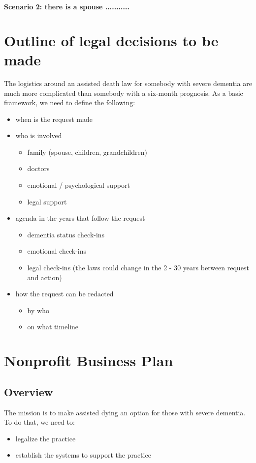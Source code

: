 \documentclass{proposalnsf}
\begin{document}
\textbf{Scenario 2: there is a spouse ...........}


\section{Outline of legal decisions to be made}
The logistics around an assisted death law for somebody with severe dementia are much more complicated than somebody with a six-month prognosis. As a basic framework, we need to define the following:
\begin{itemize}
    \item{when is the request made}

    \item{who is involved}
      \begin{itemize}
          \item{family (spouse, children, grandchildren)}
          \item{doctors}
          \item{emotional / psychological support}
          \item{legal support}
      \end{itemize}

  \item{agenda in the years that follow the request}
      \begin{itemize}
          \item{dementia status check-ins}
          \item{emotional check-ins}
          \item{legal check-ins (the laws could change in the 2 - 30 years between request and action)}
      \end{itemize}

  \item{how the request can be redacted}
      \begin{itemize}
          \item{by who}
          \item{on what timeline}
      \end{itemize}

\end{itemize}
 
    

        
        
\section{Nonprofit Business Plan}
\subsection{Overview}
The mission is to make assisted dying an option for those with severe dementia. To do that, we need to:
      \begin{itemize}
          \item{legalize the practice}
          \item{establish the systems to support the practice}
      \end{itemize}
\end{document}
